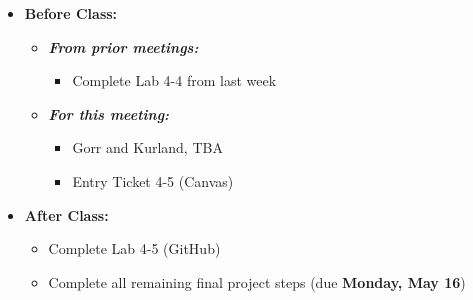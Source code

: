 \documentclass[
]{book}
\providecommand{\tightlist}{%
  \setlength{\itemsep}{0pt}\setlength{\parskip}{0pt}}
\begin{document}
\begin{itemize}
\tightlist
\item
  \textbf{Before Class:}

  \begin{itemize}
  \tightlist
  \item
    \textbf{\emph{From prior meetings:}}

    \begin{itemize}
    \tightlist
    \item
      Complete Lab 4-4 from last week
    \end{itemize}
  \item
    \textbf{\emph{For this meeting:}}

    \begin{itemize}
    \tightlist
    \item
      Gorr and Kurland, TBA
    \item
      Entry Ticket 4-5 (Canvas)
    \end{itemize}
  \end{itemize}
\item
  \textbf{After Class:}

  \begin{itemize}
  \tightlist
  \item
    Complete Lab 4-5 (GitHub)
  \item
    Complete all remaining final project steps (due \textbf{Monday, May 16})
  \end{itemize}
\end{itemize}

  
\end{document}
